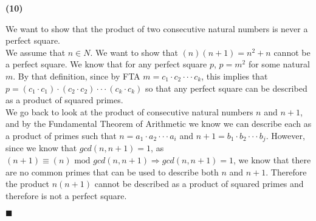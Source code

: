 \documentclass[20pt]{article}
\begin{document}
\noindent
\textbf{(10)}
\begin{text}
    We want to show that the product of two consecutive natural numbers is never a perfect square.\\
    
    \noindent
    We assume that $n \in N$. We want to show that $(n)(n+1) = n^2 + n$ cannot be a perfect square. We know that for any perfect square $p$, $p = m^2$ for some natural $m$. By that definition, since by FTA $m = c_1 \cdot c_2 \cdot \cdot \cdot c_k$, this implies that $p = (c_1 \cdot c_1) \cdot (c_2 \cdot c_2) \cdot \cdot \cdot (c_k \cdot c_k)$ so that any perfect square can be described as a product of squared primes.\\
    
    \noindent
    We go back to look at the product of consecutive natural numbers $n$ and $n + 1$, and by the Fundamental Theorem of Arithmetic we know we can describe each as a product of primes such that $n = a_1 \cdot a_2 \cdot \cdot \cdot a_{i}$ and $n + 1 = b_1 \cdot b_2 \cdot \cdot \cdot b_j$. However, since we know that $gcd(n, n + 1) = 1$, as $(n + 1) \equiv (n) \text{ mod } gcd(n,  n + 1) \Longrightarrow gcd(n, n + 1) = 1$, we know that there are no common primes that can be used to describe both $n$ and $n + 1$. Therefore the product $n(n+1)$ cannot be described as a product of squared primes and therefore is not a perfect square.
    
    \hfill $\blacksquare$
\end{text}\\
\end{document}
